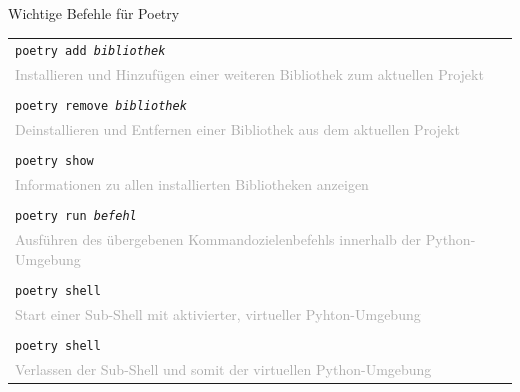 {{\begin{frame}[fragile]{Wichtige Befehle für Poetry}
{\begin{tabular}{|p{}|}
        \cellcolor{gray!15}
        \texttt{poetry add \textit{bibliothek}} \\
        \cellcolor{gray!15}
        \textcolor{darkgray}{Installieren und Hinzufügen einer weiteren Bibliothek zum aktuellen Projekt} \\

        \cellcolor{gray!7}
        \\

        \cellcolor{gray!15}
        \texttt{poetry remove \textit{bibliothek}} \\
        \cellcolor{gray!15}
        \textcolor{darkgray}{Deinstallieren und Entfernen einer Bibliothek aus dem aktuellen Projekt} \\

        \cellcolor{gray!7}
        \\

        \cellcolor{gray!15}
        \texttt{poetry show} \\
        \cellcolor{gray!15}
        \textcolor{darkgray}{Informationen zu allen installierten Bibliotheken anzeigen} \\

        \cellcolor{gray!7}
        \\

        \cellcolor{gray!15}
        \texttt{poetry run \textit{befehl}} \\
        \cellcolor{gray!15}
        \textcolor{darkgray}{Ausführen des übergebenen Kommandozielenbefehls innerhalb der Python-Umgebung} \\

        \cellcolor{gray!7}
        \\

        \cellcolor{gray!15}
        \texttt{poetry shell} \\
        \cellcolor{gray!15}
        \textcolor{darkgray}{Start einer Sub-Shell mit aktivierter, virtueller Pyhton-Umgebung} \\

        \cellcolor{gray!7}
        \\

        \cellcolor{gray!15}
        \texttt{poetry shell} \\
        \cellcolor{gray!15}
        \textcolor{darkgray}{Verlassen der Sub-Shell und somit der virtuellen Python-Umgebung} \\

        \hline
    \end{tabular}
    }
\end{frame}
}

}
